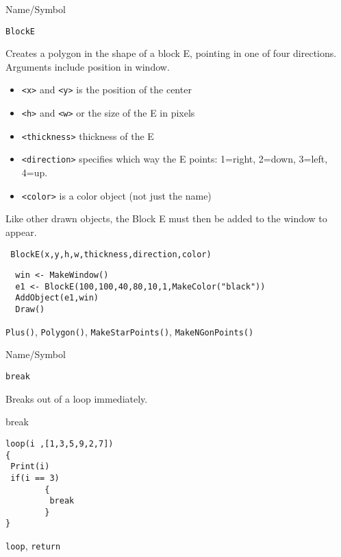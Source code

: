 \begin{desc}{Name/Symbol}

\item[Name/Symbol]  	\verb+BlockE+ 

\item[Description] Creates a polygon in the shape of a
 block E, pointing in one of four directions.
Arguments include position in window.
\begin{itemize}
\item \verb+<x>+ and \verb+<y>+ is the position of the center
\item \verb+<h>+ and \verb+<w>+ or the size of the E in pixels
\item \verb+<thickness>+ thickness of the E
\item \verb+<direction>+ specifies which way the E points:  1=right,
  2=down, 3=left, 4=up.
\item \verb+<color>+ is a color object (not just the name)
\end{itemize}

Like other drawn objects, the Block E must then be added to the window
to appear.

\item[Usage]		
\begin{verbatim}
 BlockE(x,y,h,w,thickness,direction,color)
\end{verbatim}

\item[Example]	
\begin{verbatim}
  win <- MakeWindow()
  e1 <- BlockE(100,100,40,80,10,1,MakeColor("black"))
  AddObject(e1,win)
  Draw()
\end{verbatim}

\item[See Also]   
\verb+Plus()+, \verb+Polygon()+, \verb+MakeStarPoints()+,
\verb+MakeNGonPoints()+
\end{desc}

\rl

\begin{desc}{Name/Symbol}
\item[Name/Symbol]  	\verb+break+

\item[Description]  	Breaks out of a loop immediately.

\item[Usage]        	break

\item[Example]
\begin{verbatim}
loop(i ,[1,3,5,9,2,7])
{
 Print(i)
 if(i == 3) 
        {
         break
        }
}
\end{verbatim}

\item[See Also]   	\verb+loop+, \verb+return+
\end{desc}

